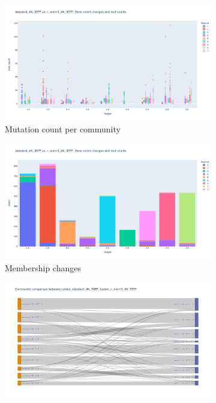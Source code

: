 \begin{figure}
    \captionsetup[subfigure]{justification=Centering}
    \begin{subfigure}[t]{0.5\textwidth}
        \includegraphics[width=\textwidth]{Images/P0/box_standard_4K_50TF_norm3_4K_50TF.png}
        \caption{Mutation count per community}
    \end{subfigure}\hspace{\fill} %
    \begin{subfigure}[t]{0.5\textwidth}
        \includegraphics[width=\linewidth]{Images/P0/memberShip_standard_4K_50TF_norm3_4K_50TF.png}
        \caption{Membership changes}
    \end{subfigure}\hspace{\fill} %
    \bigskip %
    \begin{subfigure}[t]{0.9\textwidth}
        \includegraphics[width=\linewidth]{Images/P0/sankey_standard_4K_50TF_norm3_4K_50TF.png}

\end{subfigure}
\end{figure}
